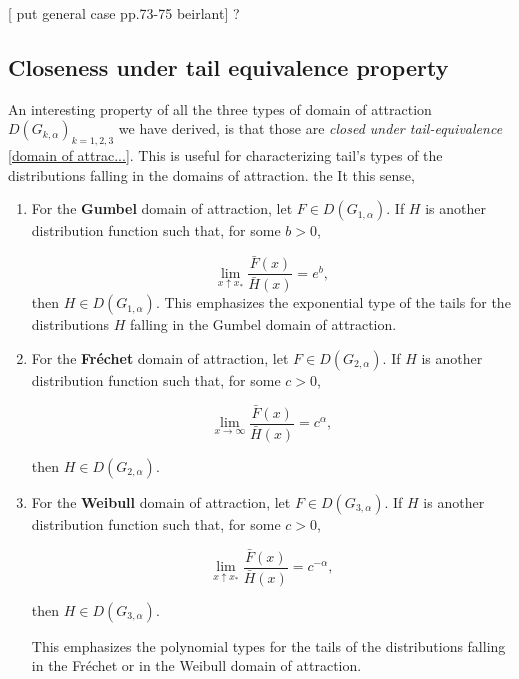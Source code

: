 \documentclass[11pt,a4paper,openany ]{book}
\begin{document}
[ put general case pp.73-75 beirlant] ?
\newline

\subsection{Closeness under tail equivalence property} An interesting property of all the three types of domain of attraction $D(G_{k,\alpha})_{k=1,2,3}$ we have derived, is that those are \emph{closed under tail-equivalence} \ref{domain of attrac...}. This is useful for characterizing tail's types of the distributions falling in the domains of attraction. the  It this sense,

\begin{enumerate}
	\item For the \textbf{Gumbel} domain of attraction,  let $F\in D(G_{1,\alpha})$. If $H$ is another distribution function such that, for some $b>0$, 
	
	\begin{equation}
	\displaystyle{\lim_{ x \uparrow x_*}} \frac{\bar{F}(x)}{\bar{H}(x)}=e^{b},
	\end{equation}
	then $H\in D(G_{1,\alpha})$. This emphasizes the exponential type of the  tails for the distributions $H$ falling in the Gumbel domain of attraction.
	
	
	\item For the \textbf{Fréchet} domain of attraction, let $F\in D(G_{2,\alpha})$. If $H$ is another distribution function such that, for some $c>0$, 
	
	\begin{equation}
	\displaystyle{\lim_{ x \to\infty}} \frac{\bar{F}(x)}{\bar{H}(x)}=c^{\alpha},
	\end{equation}
	
	then $H\in D(G_{2,\alpha})$.
	
	\item For the \textbf{Weibull} domain of attraction,  let $F\in D(G_{3,\alpha})$. If $H$ is another distribution function such that, for some $c>0$, 
	
	\begin{equation}
	\displaystyle{\lim_{ x  \uparrow  x_*}} \frac{\bar{F}(x)}{\bar{H}(x)}=c^{-\alpha},
	\end{equation}
	
	then $H\in D(G_{3,\alpha})$.
	
	This emphasizes the polynomial types for the tails of the distributions falling in the Fréchet or in the Weibull domain of attraction.
\end{enumerate}
\end{document}
